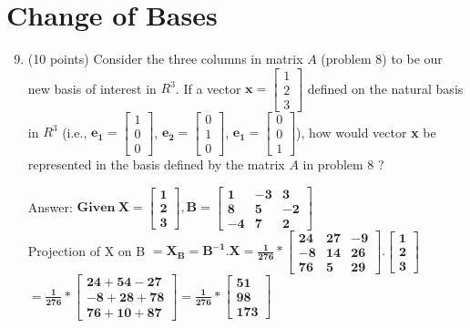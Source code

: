 \documentclass{article}%
\begin{document}
\section*{Change of Bases}
\begin{enumerate}
  \setcounter{enumi}{8}
    \item (10 points) Consider the three columns in matrix $A$ (problem 8) to be our new basis of interest in $R^3$. If a vector $\mathbf{x} = \begin{bmatrix} 1 \\ 2 \\ 3 \end{bmatrix}$ defined on the natural basis in $R^3$ (i.e.,  $\mathbf{e_1} = \begin{bmatrix} 1 \\ 0 \\ 0 \end{bmatrix}$, $\mathbf{e_2} = \begin{bmatrix} 0 \\ 1 \\ 0 \end{bmatrix}$, $\mathbf{e_1} = \begin{bmatrix} 0 \\ 0 \\ 1 \end{bmatrix}$), how would vector \textbf{x} be represented in the basis defined by the matrix $A$ in problem 8 ?\vspace{2ex}
    

    Answer: $\mathbf{ Given \ X = \begin{bmatrix} 1 \\ 2 \\ 3 \end{bmatrix}, B = \begin{bmatrix} 1 & -3 & 3 \\ 8 & 5 & -2 \\ -4 & 7 & 2 \end{bmatrix} }$ \\
    Projection of X on B $\mathbf{ = X_B = B^{-1}.X = \frac{1}{276} * \begin{bmatrix} 24 & 27 & -9 \\ -8 & 14 & 26 \\ 76 & 5 & 29 \end{bmatrix}. \begin{bmatrix} 1 \\ 2 \\ 3 \end{bmatrix} }$ \\
    $\mathbf{ = \frac{1}{276} * \begin{bmatrix} 24 + 54 - 27 \\ -8 + 28 + 78 \\ 76 + 10 + 87 \end{bmatrix} = \frac{1}{276} * \begin{bmatrix} 51 \\ 98 \\ 173 \end{bmatrix} }$

\end{enumerate}
\end{document}
